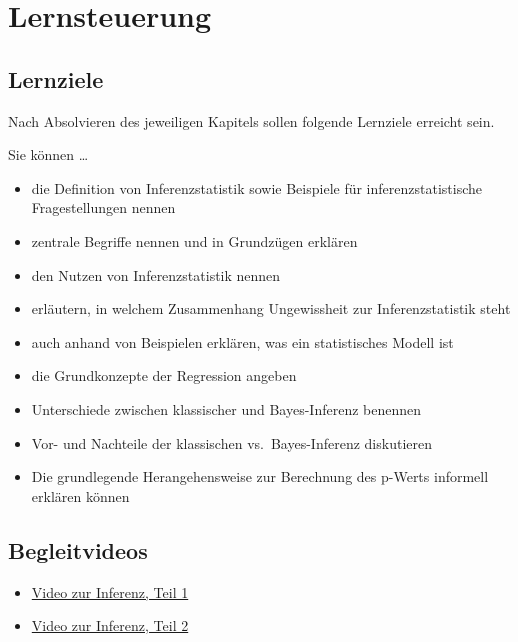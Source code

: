 \documentclass[
  a4paper,
  DIV=11]{scrreprt}
\providecommand{\tightlist}{%
  \setlength{\itemsep}{0pt}\setlength{\parskip}{0pt}}\usepackage{longtable,booktabs,array}
\theoremstyle{definition}
\theoremstyle{remark}
\begin{document}
\hypertarget{lernsteuerung}{%
\section{Lernsteuerung}\label{lernsteuerung}}

\hypertarget{lernziele-1}{%
\subsection{Lernziele}\label{lernziele-1}}

Nach Absolvieren des jeweiligen Kapitels sollen folgende Lernziele
erreicht sein.

Sie können \ldots{}

\begin{itemize}
\tightlist
\item
  die Definition von Inferenzstatistik sowie Beispiele für
  inferenzstatistische Fragestellungen nennen
\item
  zentrale Begriffe nennen und in Grundzügen erklären
\item
  den Nutzen von Inferenzstatistik nennen
\item
  erläutern, in welchem Zusammenhang Ungewissheit zur Inferenzstatistik
  steht
\item
  auch anhand von Beispielen erklären, was ein statistisches Modell ist
\item
  die Grundkonzepte der Regression angeben
\item
  Unterschiede zwischen klassischer und Bayes-Inferenz benennen
\item
  Vor- und Nachteile der klassischen vs.~Bayes-Inferenz diskutieren
\item
  Die grundlegende Herangehensweise zur Berechnung des p-Werts informell
  erklären können
\end{itemize}

\hypertarget{begleitvideos}{%
\subsection{Begleitvideos}\label{begleitvideos}}

\begin{itemize}
\tightlist
\item
  \href{https://youtu.be/gcwWwBy0kPI}{Video zur Inferenz, Teil 1}
\item
  \href{https://https://youtu.be/QNMVi6IqQ90}{Video zur Inferenz, Teil
  2}
\end{itemize}
\end{document}
